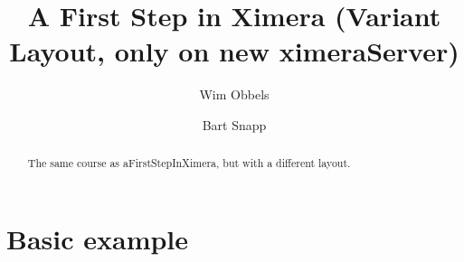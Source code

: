 \documentclass{xourse}
\author{Wim Obbels \and Bart Snapp}
\title{A First Step in Ximera (Variant Layout, only on new ximeraServer)}
\begin{document}
\begin{abstract}
    The same course as aFirstStepInXimera, but with a different layout.
\end{abstract}
\maketitle
\part{Basic example}

    \chapterstyle
    \sectionstyle

    \chapterstyle
\end{document}
